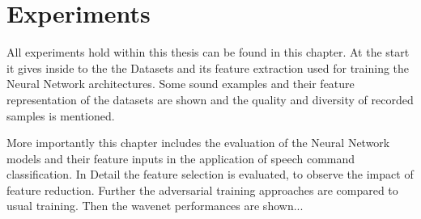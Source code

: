 
\chapter{Experiments}\label{sec:exp}
All experiments hold within this thesis can be found in this chapter.
At the start it gives inside to the the Datasets and its feature extraction used for training the Neural Network architectures.
Some sound examples and their feature representation of the datasets are shown and the quality and diversity of recorded samples is mentioned.

More importantly this chapter includes the evaluation of the Neural Network models and their feature inputs in the application of speech command classification.
In Detail the feature selection is evaluated, to observe the impact of feature reduction.
Further the adversarial training approaches are compared to usual training.
Then the wavenet performances are shown...













